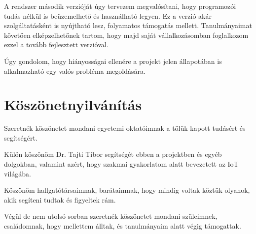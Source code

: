 \documentclass[a4paper,12pt]{thesis-ekf}
\theoremstyle{definition}
\begin{document}
    	A rendszer második verzióját úgy tervezem megvalósítani, hogy programozói tudás nélkül is beüzemelhető és használható legyen. Ez a verzió akár szolgáltatásként is nyújtható lesz, folyamatos támogatás mellett. Tanulmányaimat követően elképzelhetőnek tartom, hogy majd saját vállalkozásomban foglalkozom ezzel a tovább fejlesztett verzióval.
    	
    	Úgy gondolom, hogy hiányosságai ellenére a projekt jelen állapotában is alkalmazható egy valós probléma megoldására.
	
	\chapter*{Köszönetnyilvánítás}
    	Szeretnék köszönetet mondani egyetemi oktatóimnak a tőlük kapott tudásért és segítségért.
    	
    	Külön köszönöm Dr. Tajti Tibor segítségét ebben a projektben és egyéb dolgokban, valamint azért, hogy szakmai gyakorlatom alatt bevezetett az IoT világába.
    	
    	Köszönöm hallgatótársaimnak, barátaimnak, hogy mindig voltak köztük olyanok, akik segíteni tudtak és figyeltek rám.
    
    	Végül de nem utolsó sorban szeretnék köszönetet mondani szüleimnek, családomnak, hogy mellettem álltak, és tanulmányaim alatt végig támogattak.
			
\end{document}
